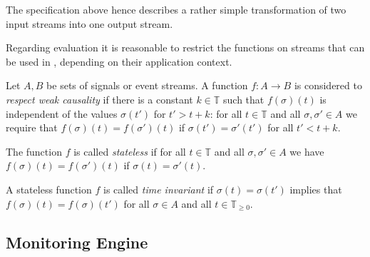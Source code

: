 The specification above hence describes a rather simple transformation of two input streams into one output stream.

Regarding evaluation it is reasonable to restrict the functions on streams that can be used in \tessla, depending on their application context.

\begin{definition}
Let $A,B$ be sets of signals or event streams.
A function $f: A → B$ is considered to \emph{respect weak causality} if there is a constant $k∈𝕋$ such that $f(σ)(t)$ is independent of the values $σ(t')$ for $t'>t+k$:
for all $t∈𝕋$ and all $σ,σ'∈A$ we require that $f(σ)(t) = f(σ')(t)$ if $σ(t')=σ'(t')$ for all $t'<t+k$.

The function $f$ is called \emph{stateless} if for all $t∈𝕋$ and all $σ,σ'∈A$ we have $f(σ)(t) = f(σ')(t)$ if $σ(t) = σ'(t)$.

A stateless function $f$ is called \emph{time invariant} if $σ(t) = σ(t')$ implies that $f(σ)(t) = f(σ)(t')$ for all $σ∈A$ and all $t∈𝕋_{≥0}$.
\end{definition}



\subsection{Monitoring Engine}

